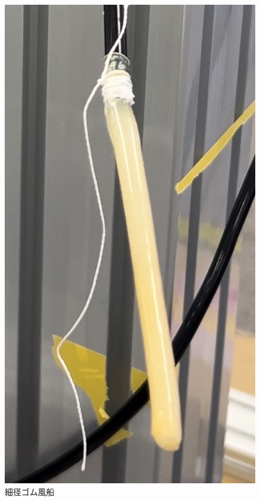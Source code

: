 \begin{figure}[h]
  \centering  %
  \includegraphics[scale=0.15]{pic/10.jpg}
  \caption{細径ゴム風船}
  \label{fig:huu}
\end{figure}

\newpage

